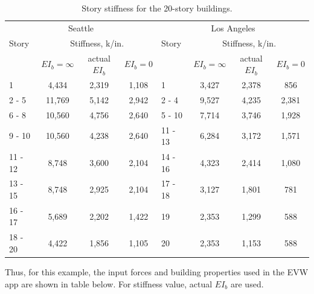 \documentclass{simcenterdocumentation}
\begin{document}
\begin{table}[H]
	\centering \caption{Story stiffness for the 20-story buildings.}
	\label{tab:stiffness_20LASE}
	\begin{tabular}{lccclccc}
	\toprule
	\multicolumn{4}{c}{Seattle}						& \multicolumn{4}{c}{Los Angeles}				\\ \cmidrule(rl){1-4}\cmidrule(rl){5-8}
	Story	& \multicolumn{3}{c}{Stiffness, k/in.}						& Story		& \multicolumn{3}{c}{Stiffness, k/in.}				\\ \cmidrule(rl){2-4}\cmidrule(rl){6-8}
			& $EI_b = \infty$	& actual $EI_b$		& $EI_b = 0$		& 			& $EI_b = \infty$	& actual $EI_b$		& $EI_b = 0$\\ \cmidrule(rl){1-4}\cmidrule(rl){5-8}
	1 		& 4,434				& 2,319				& 1,108				& 1 		& 3,427				& 2,378				& 856				\\
	2 - 5	& 11,769			& 5,142				& 2,942				& 2 - 4		& 9,527				& 4,235				& 2,381				\\ 
	6 - 8	& 10,560			& 4,756				& 2,640				& 5 - 10	& 7,714				& 3,746				& 1,928				\\ 
	9 - 10	& 10,560			& 4,238				& 2,640				& 11 - 13	& 6,284				& 3,172				& 1,571				\\ 
	11 - 12	& 8,748				& 3,600				& 2,104				& 14 - 16	& 4,323				& 2,414				& 1,080				\\ 
	13 - 15	& 8,748				& 2,925				& 2,104				& 17 - 18	& 3,127				& 1,801				& 781				\\ 
	16 - 17	& 5,689				& 2,202				& 1,422				& 19		& 2,353				& 1,299				& 588				\\ 
	18 - 20	& 4,422				& 1,856				& 1,105				& 20		& 2,353				& 1,153				& 588				\\ \bottomrule
	\end{tabular}
\end{table}


Thus, for this example, the input forces and building properties used in the EVW app are shown in table below. For stiffness value, actual $EI_b$ are used.
\end{document}
